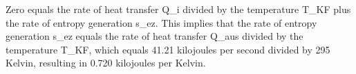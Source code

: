 Zero equals the rate of heat transfer Q_i divided by the temperature T_KF plus the rate of entropy generation s_ez. This implies that the rate of entropy generation s_ez equals the rate of heat transfer Q_aus divided by the temperature T_KF, which equals 41.21 kilojoules per second divided by 295 Kelvin, resulting in 0.720 kilojoules per Kelvin.
